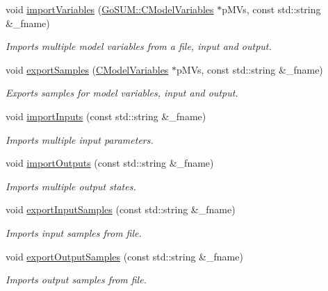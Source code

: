 \begin{DoxyCompactItemize}
void \hyperlink{class_go_s_u_m_1_1_c_container_a2d46b9ba16bacb25c69859354dec3a0f}{import\-Variables} (\hyperlink{class_go_s_u_m_1_1_c_model_variables}{Go\-S\-U\-M\-::\-C\-Model\-Variables} $\ast$p\-M\-Vs, const std\-::string \&\-\_\-fname)
\begin{DoxyCompactList}\small\item\em Imports multiple model variables from a file, input and output. \end{DoxyCompactList}\item 
void \hyperlink{class_go_s_u_m_1_1_c_container_a8c0086eb9ba429669d42ddcfffc5f207}{export\-Samples} (\hyperlink{class_go_s_u_m_1_1_c_model_variables}{C\-Model\-Variables} $\ast$p\-M\-Vs, const std\-::string \&\-\_\-fname)
\begin{DoxyCompactList}\small\item\em Exports samples for model variables, input and output. \end{DoxyCompactList}\item 
void \hyperlink{class_go_s_u_m_1_1_c_container_a2f34109ab3a927dde8973956c7dfc71c}{import\-Inputs} (const std\-::string \&\-\_\-fname)
\begin{DoxyCompactList}\small\item\em Imports multiple input parameters. \end{DoxyCompactList}\item 
void \hyperlink{class_go_s_u_m_1_1_c_container_a735339d9635295f7d05f5ceaad6a530e}{import\-Outputs} (const std\-::string \&\-\_\-fname)
\begin{DoxyCompactList}\small\item\em Imports multiple output states. \end{DoxyCompactList}\item 
void \hyperlink{class_go_s_u_m_1_1_c_container_a3ef90731268021db18187f907c65a281}{export\-Input\-Samples} (const std\-::string \&\-\_\-fname)
\begin{DoxyCompactList}\small\item\em Imports input samples from file. \end{DoxyCompactList}\item 
void \hyperlink{class_go_s_u_m_1_1_c_container_aaf22f286b7da9d51204be1d16574b767}{export\-Output\-Samples} (const std\-::string \&\-\_\-fname)
\begin{DoxyCompactList}\small\item\em Imports output samples from file. \end{DoxyCompactList}\item 

\end{DoxyCompactItemize}

